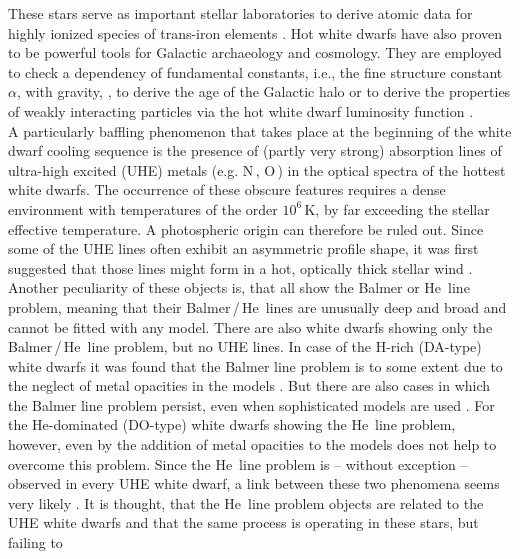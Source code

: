 \documentclass{aa}
\newcounter{Rco}
\newcommand{\Ionst}[1]{\setcounter{Rco}{#1}\Roman{Rco}}
\newcommand{\Ion}[2]{\mbox{#1\,{\scriptsize\Ionst{#2}}}}
\begin{document}
These stars serve as important stellar laboratories to derive atomic data for
highly ionized species of trans-iron elements \citep{Rauch2012, Rauch2014a,
  Rauch2014b, Rauch+2015a, Rauch+2015b, Rauch+2016, Rauch+2017a, Rauch+2017b}.
Hot white dwarfs have also proven to be powerful tools for Galactic
archaeology and cosmology. They are employed to check a dependency of fundamental
constants, i.e., the fine structure constant $\alpha$, with gravity,
\citep{Berengut+2013, Bainbridge+2017, Hu+2020}, to derive the age of the
Galactic halo \citep{Kalirai2012, Kilic+2019} or to derive the properties of weakly
interacting particles via the hot white dwarf luminosity function
\citep{Isern2008, MillerBertolami2014b, MillerBertolami2014a}.\\
 
A particularly baffling phenomenon that takes place at the beginning of the
white dwarf cooling sequence is the presence of (partly very strong) absorption lines of
ultra-high excited (UHE) metals (e.g. \Ion{N}{7}, \Ion{O}{8}) in the optical
spectra of the hottest white dwarfs. The occurrence of
these obscure features requires a dense environment with temperatures of the
order $10^6$\,K, by far exceeding the stellar effective temperature. A
photospheric origin can therefore be ruled out. Since some of the UHE lines
often exhibit an asymmetric profile shape, it was first suggested that those
lines might form in a hot, optically thick stellar wind
\citep{Werner+1995}.
Another peculiarity of these objects is, that all
show the Balmer or \Ion{He}{2} line problem, meaning that their
Balmer\,/\,\Ion{He}{2} lines are unusually deep and broad and cannot
be fitted with any model.
There are also white dwarfs showing only the Balmer\,/\,\Ion{He}{2} line
problem, but no UHE lines. In case of the H-rich (DA-type) white dwarfs
it was found that the Balmer line problem is to some extent due to the
neglect of metal opacities in the models \citep{Werner1996}. But there
are also cases in which the Balmer line problem
persist, even when sophisticated models are used
\citep{Gianninas+2011, Werner+2018a, Werner+2019}. For the He-dominated
(DO-type) white dwarfs showing the \Ion{He}{2} line problem, however,
even by the addition of metal opacities to the models does not help to
overcome this problem. Since the \Ion{He}{2} line problem is -- without
exception -- observed in every UHE white dwarf, a link between these
two phenomena seems very likely \citep{Werner+2004}. It is thought, that
the \Ion{He}{2} line problem objects are related to the UHE white dwarfs
and that the same process is operating in these stars, but failing to
\end{document}
